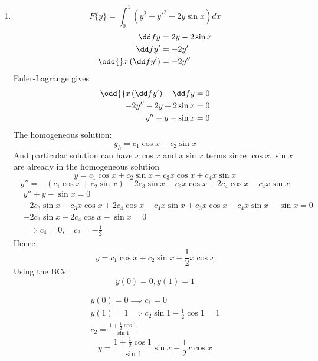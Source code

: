 \documentclass{X:/Documents/Coding/Latex/myassignment}
\begin{document}
\begin{enumerate}
\begin{enumerate}
	\item 
	\[F\{y\} = \int_0^1 (y^2 - y'^2 - 2y\sin x) dx\]
	\begin{align*}
		\dd fy &=2y - 2\sin x\\
		\dd f{y'} &= -2y'\\
		\odd{}x\left(\dd f {y'}\right) &= -2y''
	\end{align*}
	Euler-Lagrange gives
	\begin{align*}
		\odd{}x \left(\dd f{y'}\right)-\dd fy  =0\\
		-2y'' - 2y + 2\sin x = 0\\
		y'' + y - \sin x = 0
	\end{align*}
	The homogeneous solution:
	\[y_{h} = c_1\cos x + c_2 \sin x\]
	And particular solution can have $x\cos x$ and $x\sin x$ terms since $\cos x,\sin x $ are already in the homogeneous solution
	 \[y = c_1\cos x + c_2 \sin x + c_3 x\cos x +c_4 x\sin x \]
	 \[y'' =-(c_1\cos x + c_2 \sin x) -2 c_3 \sin x - c_3x\cos x + 2c_4\cos x - c_4 x\sin x \]
	 \begin{align*}
	 	&y'' +y - \sin x =0\\
	 	&-2 c_3 \sin x - c_3x\cos x + 2c_4\cos x - c_4 x\sin x + c_3 x\cos x +c_4 x\sin x - \sin x = 0\\
	 	&-2 c_3 \sin x  + 2c_4\cos x - \sin x = 0\\
	 	&\implies c_4 = 0,\quad c_3 = -\frac12
	 \end{align*}
	 Hence
	 \[y = c_1 \cos x + c_2 \sin x - \frac12 x\cos x\]
	 Using the BCs:
	 \[y(0) = 0, y(1) =1\]

	 \begin{align*}
	 	y(0) = 0 \implies c_1 = 0\\
	 	y(1) = 1 \implies c_2\sin 1 - \frac12 \cos 1 = 1\\
	 	c_2 = \frac{1 + \frac12 \cos 1}{\sin 1}
	 \end{align*}
	 \[\boxed{ y = \frac{1 + \frac12 \cos 1}{\sin 1} \sin x - \frac12 x\cos x}\]
 	 



\end{enumerate}
\end{enumerate}
\end{document}
